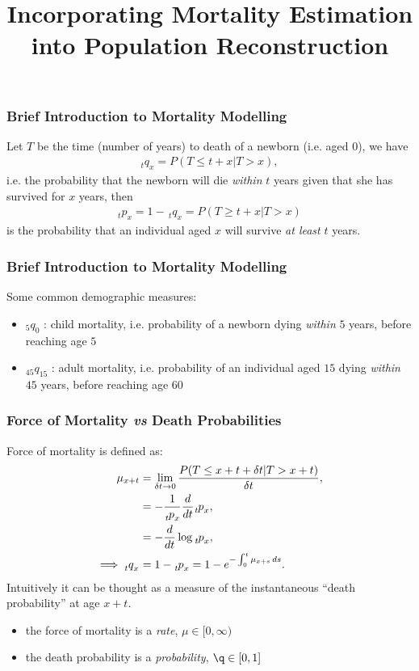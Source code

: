 \documentclass[hyperref={colorlinks, citecolor=blue}]{beamer}
\title{Incorporating Mortality Estimation into Population Reconstruction}
\begin{document}
\frame{\titlepage}

\begin{frame}
\frametitle{Brief Introduction to Mortality Modelling}
Let $T$ be the time (number of years) to death of a newborn (i.e. aged $0$), we have
\begin{align*}
_tq_x = P(T \leq t+x | T > x),
\end{align*}
 i.e. the probability that the newborn will die \textit{within} $t$ years given that she has survived for $x$ years, then 
\begin{align*}
_tp_x = 1 - \, _tq_x = P(T \geq t+x | T > x)
\end{align*}
 is the probability that an individual aged $x$ will survive \textit{at least} $t$ years.
\end{frame}

\begin{frame}
\frametitle{Brief Introduction to Mortality Modelling}
Some common demographic measures:
\begin{itemize}
\item $_{5}q_{0}$ : child mortality, i.e. probability of a newborn dying \textit{within} $5$ years, before reaching age $5$
\item $_{45}q_{15}$ : adult mortality, i.e. probability of an individual aged $15$ dying \textit{within} $45$ years, before reaching age $60$
\end{itemize}
\end{frame}

\begin{frame}
\frametitle{Force of Mortality \textit{vs} Death Probabilities}
Force of mortality is defined as:
\begin{align*}
\mu_{x+t} &= \lim_{\delta t \to 0} \frac{P(T \leq x+t+\delta t	| T > x+t)}{\delta t},	\\
					&= - \frac{1}{\tensor[_t]{p}{_x}}\frac{d}{dt} \tensor[_t]{p}{_x}, \\
					&= -\frac{d}{dt} \log \tensor[_t]{p}{_x}, \\
					\implies \tensor[_t]{q}{_x} &= 1- \tensor[_t]{p}{_x} = 1 - e^{- \int^t_0 \mu_{x+s} \, ds}.
\end{align*}
Intuitively it can be thought as a measure of the instantaneous ``death probability'' at age $x+t$. 
\begin{itemize}
\item the force of mortality is a \textit{rate}, $\mu \in [0, \infty)$
\item the death probability is a \textit{probability}, $\q \in [0, 1]$
\end{itemize}
\end{frame}
\end{document}
